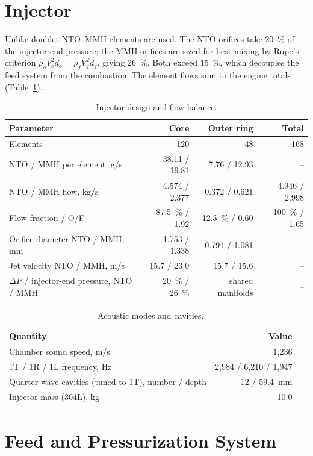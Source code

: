\documentclass[10pt]{article}
\begin{document}
\section{Injector}
Unlike-doublet NTO--MMH elements are used. The NTO orifices take 20~\% of the injector-end pressure; the MMH orifices
are sized for best mixing by Rupe's criterion $\rho_o V_o^2 d_o = \rho_f V_f^2 d_f$, giving 26~\%. Both exceed 15~\%,
which decouples the feed system from the combustion. The element flows sum to the engine totals
(Table~\ref{tab:inj}).
\begin{table}[H]\centering\small\caption{Injector design and flow balance.}\label{tab:inj}
\begin{tabular}{lrrr}\toprule
Parameter & Core & Outer ring & Total \\\midrule
Elements & 120 & 48 & 168 \\
NTO / MMH per element, g/s & 38.11 / 19.81 & 7.76 / 12.93 & -- \\
NTO / MMH flow, kg/s & 4.574 / 2.377 & 0.372 / 0.621 & 4.946 / 2.998 \\
Flow fraction / O/F & 87.5~\% / 1.92 & 12.5~\% / 0.60 & 100~\% / 1.65 \\
Orifice diameter NTO / MMH, mm & 1.753 / 1.338 & 0.791 / 1.081 & -- \\
Jet velocity NTO / MMH, m/s & 15.7 / 23.0 & 15.7 / 15.6 & -- \\
$\Delta P$ / injector-end pressure, NTO / MMH & 20~\% / 26~\% & shared manifolds & -- \\
\bottomrule\end{tabular}\end{table}
\begin{table}[H]\centering\small\caption{Acoustic modes and cavities.}\label{tab:acoustic}
\begin{tabular}{lr}\toprule
Quantity & Value \\\midrule
Chamber sound speed, m/s & 1{,}236 \\
1T / 1R / 1L frequency, Hz & 2{,}984 / 6{,}210 / 1{,}947 \\
Quarter-wave cavities (tuned to 1T), number / depth & 12 / 59.4~mm \\
Injector mass (304L), kg & 10.0 \\
\bottomrule\end{tabular}\end{table}

\section{Feed and Pressurization System}
\end{document}
